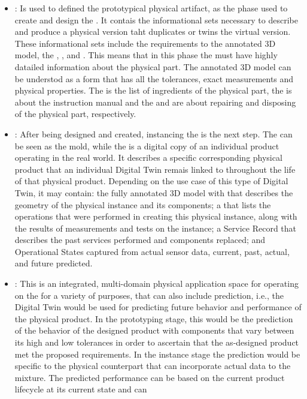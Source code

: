 \begin{itemize}
    \item \DTP : Is used to defined the prototypical physical artifact, as the phase used to create and
    design the \DT. It contais the informational sets necessary to describe and produce a physical version taht duplicates or twins
    the virtual version. These informational sets include the requirements to the annotated 3D model, the \BoM,
    \BoP, \BoS and \BoD. This means that in this phase the \DT must have highly
    datailed information about the physical part. The annotated 3D model can be understod as a form that has all the tolerances,
    exact measurements and physical properties. The \BoM is the list of ingredients of the physical part, the \BoP is about the
    instruction manual and the \BoS and \BoD are about repairing and disposing of the physical part, respectively.
    \item \DTI : After being designed and created, instancing the \DT is the next step. The \DTP can be seen as
    the mold, while the \DTI is a digital copy of an individual product operating in the real world. It describes a specific 
    corresponding physical product that an individual Digital Twin remais linked to throughout the life of that physical product. 
    Depending on the use case of this type of Digital Twin, it may contain: the fully annotated 3D model with \GDNT that describes
    the geometry of the physical instance and its components; a \BoP that lists 
    the operations that were performed in creating this physical instance, along with the results of measurements and tests on the 
    instance; a Service Record that describes the past services performed and components replaced; and Operational States captured 
    from actual sensor data, current, past, actual, and future predicted.
    \item \DTE : This is an integrated, multi-domain physical application space for operating on the \DT for 
    a variety of purposes, that can also include prediction, i.e., the Digital Twin would be used for predicting future behavior and 
    performance of the physical product. In the prototyping stage, this would be the prediction of the behavior of the designed 
    product with components that vary between its high and low tolerances in order to ascertain that the as-designed product met the 
    proposed requirements. In the instance stage the prediction would be specific to the physical counterpart that can incorporate 
    actual data to the mixture. The predicted performance can be based on the current product lifecycle at its current state and can 

\end{itemize}
